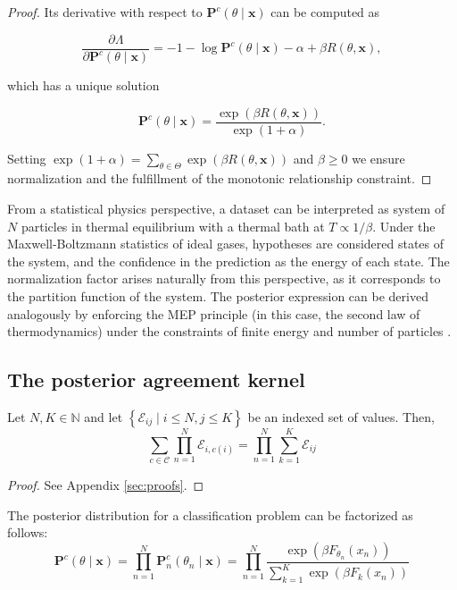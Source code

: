 \begin{proof}
    Its derivative with respect to $\mathbf{P}^c(\theta \mid \bm{x})$ can be computed as

    $$
    \frac{\partial \Lambda}{\partial \mathbf{P}^c(\theta \mid \bm{x})} = -1 - \log \mathbf{P}^c(\theta \mid \bm{x}) - \alpha + \beta R(\theta, \bm{x}),
    $$

    which has a unique solution

    $$
    \mathbf{P}^c(\theta \mid \bm{x}) = \frac{\exp \left ( \beta R(\theta, \bm{x}) \right )}{\exp \left ( 1+ \alpha \right )}.
    $$

    Setting $\exp \left ( 1+ \alpha \right ) = \sum_{\theta \in \Theta} \exp \left ( \beta R(\theta, \bm{x}) \right )$ and $\beta \geq 0$ 
    we ensure normalization and the fulfillment of the monotonic relationship constraint.
\end{proof}

From a statistical physics perspective, a dataset can be interpreted as system of 
$N$ particles in thermal equilibrium with a thermal bath at $T \propto 1/\beta$. 
Under the Maxwell-Boltzmann statistics of ideal gases, hypotheses are considered 
states of the system, and the confidence in the prediction as the energy of each state. 
The normalization factor arises naturally from this perspective, as it corresponds to 
the partition function of the system. The posterior expression can be derived analogously 
by enforcing the MEP principle (in this case, the second law of thermodynamics) under 
the constraints of finite energy and number of particles
\cite{bovierStatisticalMechanicsDisordered2012}.

\subsection{The posterior agreement kernel}

\begin{lemma}\label{lemma:exchangeability} 
    Let $N, K \in \mathbb{N}$ and let $\left\{\mathcal{E}_{i j} \mid i \leq N, j \leq K\right\}$ be an indexed set of values. Then,
    $$
    \sum_{c \in \mathcal{C}} \prod_{n=1}^N \mathcal{E}_{i, c(i)}=\prod_{n=1}^N \sum_{k=1}^K \mathcal{E}_{i j}
    $$
\end{lemma}

\begin{proof}
    See Appendix \ref{sec:proofs}.
\end{proof}

\begin{lemma}\label{theorem:posterior_factorization}

    The posterior distribution for a classification problem can be factorized as follows:
    $$
    \mathbf{P}^c(\theta \mid \bm{x}) = \prod_{n=1}^N  \mathbf{P}_n^c(\theta_n \mid \bm{x}) = \prod_{n=1}^N \frac{\exp \left ( \beta F_{\theta_n}(x_n) \right )}{\sum_{k=1}^K \exp \left ( \beta F_k(x_n) \right )}
    $$
\end{lemma}

